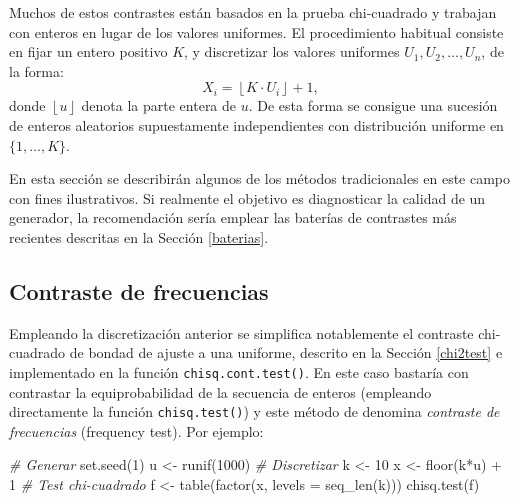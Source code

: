 \documentclass[
]{book}
\newenvironment{Shaded}{\begin{snugshade}}{\end{snugshade}}
\newcommand{\AttributeTok}[1]{\textcolor[rgb]{0.77,0.63,0.00}{#1}}
\newcommand{\CommentTok}[1]{\textcolor[rgb]{0.56,0.35,0.01}{\textit{#1}}}
\newcommand{\DecValTok}[1]{\textcolor[rgb]{0.00,0.00,0.81}{#1}}
\newcommand{\FunctionTok}[1]{\textcolor[rgb]{0.00,0.00,0.00}{#1}}
\newcommand{\NormalTok}[1]{#1}
\newcommand{\OtherTok}[1]{\textcolor[rgb]{0.56,0.35,0.01}{#1}}
\newcommand{\SpecialCharTok}[1]{\textcolor[rgb]{0.00,0.00,0.00}{#1}}
\theoremstyle{break}
\theoremstyle{nonumberplain}
\begin{document}
Muchos de estos contrastes están basados en la prueba chi-cuadrado y trabajan con enteros en lugar de los valores uniformes. El procedimiento habitual consiste en fijar un entero positivo \(K\), y discretizar los valores uniformes \(U_{1},U_{2},\ldots,U_{n}\), de la forma:
\[X_i = \left\lfloor K\cdot U_{i}\right\rfloor + 1 ,\]
donde \(\left\lfloor u\right\rfloor\) denota la parte entera de \(u\).
De esta forma se consigue una sucesión de enteros aleatorios supuestamente independientes con distribución uniforme en \(\{1, \ldots, K\}\).

En esta sección se describirán algunos de los métodos tradicionales en este campo con fines ilustrativos. Si realmente el objetivo es diagnosticar la calidad de un generador, la recomendación sería emplear las baterías de contrastes más recientes descritas en la Sección \ref{baterias}.

\hypertarget{freq-test}{%
\subsection{Contraste de frecuencias}\label{freq-test}}

Empleando la discretización anterior se simplifica notablemente el contraste chi-cuadrado de bondad de ajuste a una uniforme, descrito en la Sección \ref{chi2test} e implementado en la función \texttt{chisq.cont.test()}.
En este caso bastaría con contrastar la equiprobabilidad de la secuencia de enteros (empleando directamente la función \texttt{chisq.test()}) y este método de denomina \emph{contraste de frecuencias} (frequency test).
Por ejemplo:

\begin{Shaded}
\begin{Highlighting}[]
\CommentTok{\# Generar}
\FunctionTok{set.seed}\NormalTok{(}\DecValTok{1}\NormalTok{)}
\NormalTok{u }\OtherTok{\textless{}{-}} \FunctionTok{runif}\NormalTok{(}\DecValTok{1000}\NormalTok{)}
\CommentTok{\# Discretizar}
\NormalTok{k }\OtherTok{\textless{}{-}} \DecValTok{10}
\NormalTok{x }\OtherTok{\textless{}{-}} \FunctionTok{floor}\NormalTok{(k}\SpecialCharTok{*}\NormalTok{u) }\SpecialCharTok{+} \DecValTok{1}
\CommentTok{\# Test chi{-}cuadrado}
\NormalTok{f }\OtherTok{\textless{}{-}} \FunctionTok{table}\NormalTok{(}\FunctionTok{factor}\NormalTok{(x, }\AttributeTok{levels =} \FunctionTok{seq\_len}\NormalTok{(k)))}
\FunctionTok{chisq.test}\NormalTok{(f)}
\end{Highlighting}
\end{Shaded}
\end{document}
